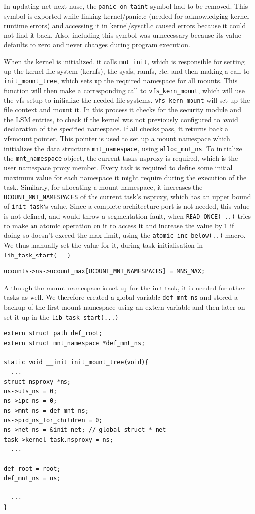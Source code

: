 \documentclass{sig-alternate}
\begin{document}
In updating net-next-nuse, the \texttt{panic\_on\_taint} symbol had to be removed.  This symbol is exported while linking kernel/panic.c (needed for acknowledging kernel
runtime errors) and accessing it in kernel/sysctl.c caused errors because it could not find it back. Also, including this symbol was unnecessary because its
value defaults to zero and never changes during program execution.

When the kernel is initialized, it calls \texttt{mnt\_init}, which is
responsible for setting
up the kernel file system (kernfs), the sysfs, ramfs, etc. and then making a
call to \texttt{init\_mount\_tree}, which sets up the required namespace for all
mounts. This function will then make a corresponding call to \texttt{vfs\_kern\_mount}, which will use the vfs setup to initialize the needed file systems.
\texttt{vfs\_kern\_mount} will set up the file context and mount it. In this process it checks for the security module and the LSM entries, to check
if the kernel was not previously configured to avoid declaration of the specified namespace. If all checks pass, it returns back a vfsmount
pointer. This pointer is used to set up a mount namespace which initializes the data structure \texttt{mnt\_namespace}, using \texttt{alloc\_mnt\_ns}. To
initialize the \texttt{mnt\_namespace} object, the current tasks nsproxy is required, which is the user namespace proxy member. Every task is required to
define some initial maximum value for each namespace it might require during the execution of the task. Similarly, for allocating a mount
namespace, it increases the \texttt{UCOUNT\_MNT\_NAMESPACES} of the current task’s nsproxy, which has an upper bound of \texttt{init\_task}‘s value.  Since
a complete architecture port is not needed, this value is not defined, and
would throw a segmentation fault, when \texttt{READ\_ONCE(...)} tries to make
an atomic operation on it to access it and increase the value by 1 if doing so doesn’t exceed the max limit, using the \texttt{atomic\_inc\_below(..)} macro.
We thus manually set the value for it, during task initialisation in \texttt{lib\_task\_start(...)}.

\begin{lstlisting}[style=CStyle]
ucounts->ns->ucount_max[UCOUNT_MNT_NAMESPACES] = MNS_MAX;
\end{lstlisting}

Although the mount namespace is set up for the init task, it is needed for other
tasks as well.  We therefore created a global variable \texttt{def\_mnt\_ns} and
stored a backup of the first mount namespace using an extern variable and then later on set it up in the \texttt{lib\_task\_start(...)}
\begin{lstlisting}[style=CStyle]
extern struct path def_root;
extern struct mnt_namespace *def_mnt_ns;

static void __init init_mount_tree(void){
  ...
struct nsproxy *ns;
ns->uts_ns = 0;
ns->ipc_ns = 0;
ns->mnt_ns = def_mnt_ns;
ns->pid_ns_for_children = 0;
ns->net_ns = &init_net; // global struct * net   
task->kernel_task.nsproxy = ns;
  ...

def_root = root;	
def_mnt_ns = ns;

  ...
}
\end{lstlisting}
\end{document}

